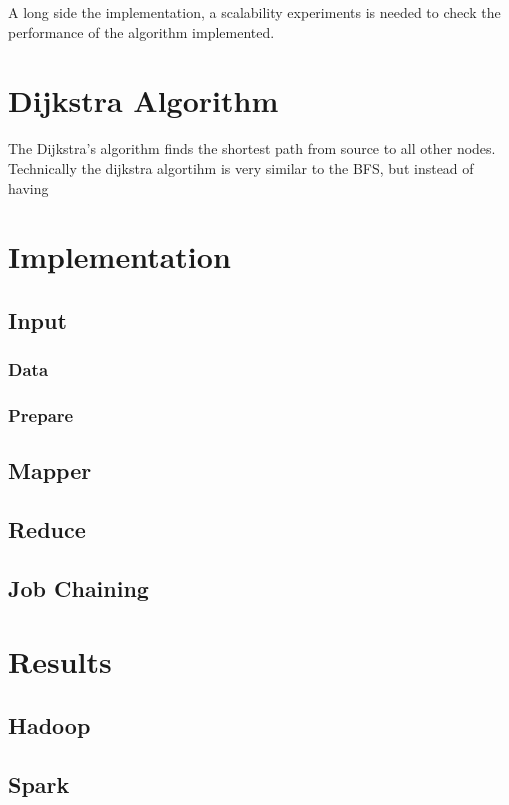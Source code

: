\documentclass[english]{article}
\begin{document}
A long side the implementation, a scalability experiments is needed to check the performance of the algorithm implemented.

\section{Dijkstra Algorithm}
The Dijkstra’s algorithm finds the shortest path from source to all other nodes. Technically the dijkstra algortihm is very similar to the BFS, but instead of having 

\section{Implementation}

\subsection{Input}

\subsubsection{Data}
\subsubsection{Prepare}

\subsection{Mapper}

\subsection{Reduce}

\subsection{Job Chaining}

\section{Results}

\subsection{Hadoop}

\subsection{Spark}
\end{document}
